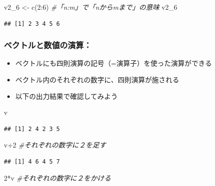 \documentclass[
]{book}
\newenvironment{Shaded}{\begin{snugshade}}{\end{snugshade}}
\newcommand{\CommentTok}[1]{\textcolor[rgb]{0.56,0.35,0.01}{\textit{#1}}}
\newcommand{\DecValTok}[1]{\textcolor[rgb]{0.00,0.00,0.81}{#1}}
\newcommand{\FunctionTok}[1]{\textcolor[rgb]{0.00,0.00,0.00}{#1}}
\newcommand{\NormalTok}[1]{#1}
\newcommand{\OtherTok}[1]{\textcolor[rgb]{0.56,0.35,0.01}{#1}}
\newcommand{\SpecialCharTok}[1]{\textcolor[rgb]{0.00,0.00,0.00}{#1}}
\providecommand{\tightlist}{%
  \setlength{\itemsep}{0pt}\setlength{\parskip}{0pt}}
\begin{document}
\begin{Shaded}
\begin{Highlighting}[]
\NormalTok{v2\_6 }\OtherTok{\textless{}{-}} \FunctionTok{c}\NormalTok{(}\DecValTok{2}\SpecialCharTok{:}\DecValTok{6}\NormalTok{) }\CommentTok{\#「n:m」で「nからmまで」の意味}
\NormalTok{v2\_6}
\end{Highlighting}
\end{Shaded}

\begin{verbatim}
## [1] 2 3 4 5 6
\end{verbatim}

\hypertarget{ux30d9ux30afux30c8ux30ebux3068ux6570ux5024ux306eux6f14ux7b97}{%
\subsubsection*{ベクトルと数値の演算：}\label{ux30d9ux30afux30c8ux30ebux3068ux6570ux5024ux306eux6f14ux7b97}}

\begin{itemize}
\tightlist
\item
  ベクトルにも四則演算の記号（=演算子）を使った演算ができる
\item
  ベクトル内のそれぞれの数字に、四則演算が施される
\item
  以下の出力結果で確認してみよう
\end{itemize}

\begin{Shaded}
\begin{Highlighting}[]
\NormalTok{v}
\end{Highlighting}
\end{Shaded}

\begin{verbatim}
## [1] 2 4 2 3 5
\end{verbatim}

\begin{Shaded}
\begin{Highlighting}[]
\NormalTok{v}\SpecialCharTok{+}\DecValTok{2}  \CommentTok{\#それぞれの数字に２を足す }
\end{Highlighting}
\end{Shaded}

\begin{verbatim}
## [1] 4 6 4 5 7
\end{verbatim}

\begin{Shaded}
\begin{Highlighting}[]
\DecValTok{2}\SpecialCharTok{*}\NormalTok{v  }\CommentTok{\#それぞれの数字に２をかける  }
\end{Highlighting}
\end{Shaded}
\end{document}
